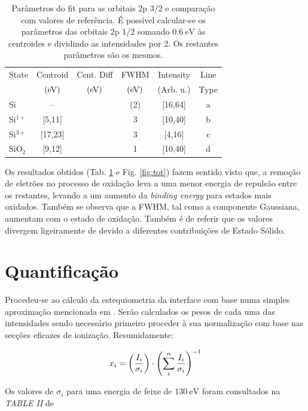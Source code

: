 \documentclass[baaa]{baaa}
\begin{document}
\begin{table}[h!]
  \centering
  \caption{Parâmetros do fit para as orbitais 2p 3/2 e comparação com valores de referência\cite{Nist}. É possível calcular-se os parâmetros das orbitais 2p 1/2 somando $0.6\ \si{\electronvolt}$ às centroides e dividindo as intensidades por 2. Os restantes parâmetros são os mesmos.}
  \begin{tabular}{lccccc}
    \hline\hline\noalign{\smallskip}
    \!\!State & \!\!\!\!Centroid &Cent. Diff& \!\!\!\!FWHM& \!\!\!\!Intensity\!\!\!\!&Line\\
    & \!\!\!\!$\qty(\si{\electronvolt})$&$\qty(\si{\electronvolt})$& \!\!\!\!$\qty(\si{\electronvolt})$& \!\!\!\!(Arb. u.)&Type\\
    \hline\noalign{\smallskip}
    \!\!Si &  -- && (2) & [16,64]&a\\
    \!\!Si$^{1+}$& [5,11]&& 3 & [10,40]&b\\
    \!\!Si$^{3+}$& [17,23]&& 3& [4,16]&c\\
    \!\!SiO$_2$ & [9,12] && 1 & [10,40]&d\\
    \hline
    \end{tabular}
    \label{table:params}
\end{table}


Os resultados obtidos (Tab. \ref{table:params} e Fig. \ref{fig:tot}) fazem sentido visto que, a remoção de eletrões no processo de oxidação leva a uma menor energia de repulsão entre os restantes, levando a um aumento da \textit{binding energy} para estados mais oxidados. Também se observa que a FWHM, tal como a componente Gaussiana, aumentam com o estado de oxidação. Também é de referir que os valores divergem ligeiramente de \cite{Himpsel} devido a diferentes contribuições de Estado Sólido.



\section{Quantificação}

Procedeu-se ao cálculo da estequiometria da interface com base numa simples aproximação mencionada em \cite{Himpsel}. Serão calculados os pesos de cada uma das intensidades sendo necessário primeiro proceder à sua normalização com base nas secções eficazes de ionização. Resumidamente:

\begin{gather}
  x_i= \qty(\frac{I_i}{\sigma_i})\cdot\qty(\sum_i^n \frac{I_i}{\sigma_i})^{-1} 
\end{gather}

Os valores de $\sigma_i$ para uma energia de feixe de $130\ \si{\electronvolt}$ foram consultados na \textit{TABLE II} de \cite{Himpsel}









\small

 
\end{document}
